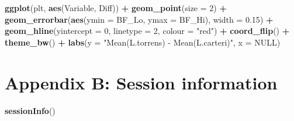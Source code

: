 \documentclass[
  11pt,
]{article}
\newenvironment{Shaded}{\begin{snugshade}}{\end{snugshade}}
\newcommand{\AttributeTok}[1]{\textcolor[rgb]{0.13,0.29,0.53}{#1}}
\newcommand{\ConstantTok}[1]{\textcolor[rgb]{0.56,0.35,0.01}{#1}}
\newcommand{\DecValTok}[1]{\textcolor[rgb]{0.00,0.00,0.81}{#1}}
\newcommand{\FloatTok}[1]{\textcolor[rgb]{0.00,0.00,0.81}{#1}}
\newcommand{\FunctionTok}[1]{\textcolor[rgb]{0.13,0.29,0.53}{\textbf{#1}}}
\newcommand{\NormalTok}[1]{#1}
\newcommand{\SpecialCharTok}[1]{\textcolor[rgb]{0.81,0.36,0.00}{\textbf{#1}}}
\newcommand{\StringTok}[1]{\textcolor[rgb]{0.31,0.60,0.02}{#1}}
\begin{document}
\begin{Shaded}
\begin{Highlighting}[]
\FunctionTok{ggplot}\NormalTok{(plt, }\FunctionTok{aes}\NormalTok{(Variable, Diff)) }\SpecialCharTok{+}
  \FunctionTok{geom\_point}\NormalTok{(}\AttributeTok{size =} \DecValTok{2}\NormalTok{) }\SpecialCharTok{+}
  \FunctionTok{geom\_errorbar}\NormalTok{(}\FunctionTok{aes}\NormalTok{(}\AttributeTok{ymin =}\NormalTok{ BF\_Lo, }\AttributeTok{ymax =}\NormalTok{ BF\_Hi), }\AttributeTok{width =} \FloatTok{0.15}\NormalTok{) }\SpecialCharTok{+}
  \FunctionTok{geom\_hline}\NormalTok{(}\AttributeTok{yintercept =} \DecValTok{0}\NormalTok{, }\AttributeTok{linetype =} \DecValTok{2}\NormalTok{, }\AttributeTok{colour =} \StringTok{"red"}\NormalTok{) }\SpecialCharTok{+}
  \FunctionTok{coord\_flip}\NormalTok{() }\SpecialCharTok{+} \FunctionTok{theme\_bw}\NormalTok{() }\SpecialCharTok{+}
  \FunctionTok{labs}\NormalTok{(}\AttributeTok{y =} \StringTok{"Mean(L.torrens) {-} Mean(L.carteri)"}\NormalTok{, }\AttributeTok{x =} \ConstantTok{NULL}\NormalTok{)}
\end{Highlighting}
\end{Shaded}

\section{Appendix B: Session
information}\label{appendix-b-session-information}

\begin{Shaded}
\begin{Highlighting}[]
\FunctionTok{sessionInfo}\NormalTok{()}
\end{Highlighting}
\end{Shaded}
\end{document}
